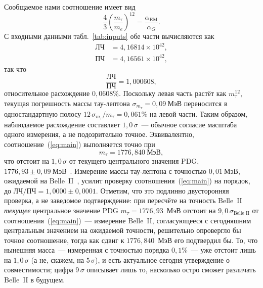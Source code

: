 \documentclass[aps,prd,twocolumn,amsmath,amssymb,floatfix,nofootinbib]{revtex4-2}
\begin{document}
Сообщаемое нами соотношение имеет вид
\begin{equation}
\frac{4}{3}\left(\frac{m_\tau}{m_e}\right)^{\!12}
= \frac{\alpha_{\mathrm{EM}}}{\alpha_G}.
\label{eq:main}
\end{equation}
С входными данными табл.~\ref{tab:inputs} обе части вычисляются как
\begin{align}
\text{ЛЧ} &= 4{,}16814\times 10^{42}, \nonumber\\
\text{ПЧ} &= 4{,}16561\times 10^{42},
\end{align}
так что
\begin{equation}
\frac{\text{ЛЧ}}{\text{ПЧ}} = 1{,}000608,
\end{equation}
относительное расхождение $0{,}0608\%$. Поскольку левая часть растёт как
$m_\tau^{12}$, текущая погрешность массы тау-лептона
$\sigma_{m_\tau}=0{,}09~\mathrm{МэВ}$ переносится в
одностандартную полосу $12\,\sigma_{m_\tau}/m_\tau = 0{,}061\%$ на левой
части. Таким образом, наблюдаемое расхождение составляет $1{,}0\,\sigma$~---
обычное согласие масштаба одного измерения, а не подозрительно точное.
Эквивалентно, соотношение~(\ref{eq:main}) выполняется точно при
\begin{equation}
m_\tau = 1776{,}840~\mathrm{МэВ},
\end{equation}
что отстоит на $1{,}0\,\sigma$ от текущего центрального значения PDG,
$1776{,}93\pm 0{,}09~\mathrm{МэВ}$~\cite{pdg2024}. Измерение массы
тау-лептона с точностью $0{,}01~\mathrm{МэВ}$, ожидаемой на
Belle~II~\cite{belleii}, усилит проверку соотношения~(\ref{eq:main}) на
порядок, до $\text{ЛЧ}/\text{ПЧ} = 1{,}0000 \pm 0{,}0001$. Отметим, что это
подлинно двусторонняя проверка, а не заведомое подтверждение: при
пересчёте на точность Belle~II \emph{текущее} центральное значение PDG
$m_\tau=1776{,}93$~МэВ отстоит на $9{,}0\,\sigma_{\text{Belle II}}$ от
соотношения~(\ref{eq:main})~--- измерение Belle~II, согласующееся с
сегодняшним центральным значением на ожидаемой точности, решительно
опровергло бы точное соотношение, тогда как сдвиг к $1776{,}840$~МэВ его
подтвердил бы. То, что нынешняя масса~--- измеренная с точностью порядка
$0{,}1\%$~--- уже отстоит лишь на $1{,}0\,\sigma$ (а не, скажем, на
$5\,\sigma$), и есть актуальное сегодня утверждение о совместимости;
цифра $9\,\sigma$ описывает лишь то, насколько остро сможет различать
Belle~II в будущем.
\end{document}
